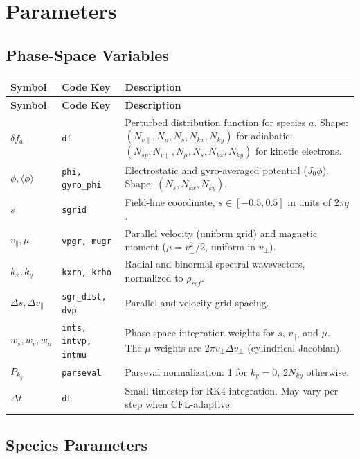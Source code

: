 \documentclass{article}
\theoremstyle{plain}
\theoremstyle{definition}
\theoremstyle{remark}
\begin{document}
\newpage
\appendix
\onecolumn

\section{Parameters}

\subsection{Phase-Space Variables}
\renewcommand{\arraystretch}{1.4}
\begin{longtable}{p{} p{} p{}}
\toprule
\textbf{Symbol} & \textbf{Code Key} & \textbf{Description} \\
\midrule
\endfirsthead
\toprule
\textbf{Symbol} & \textbf{Code Key} & \textbf{Description} \\
\midrule
\endhead
\bottomrule
\endfoot
$\delta f_a$ & \texttt{df} & Perturbed distribution function for species $a$. Shape: $(N_{v\parallel}, N_\mu, N_s, N_{kx}, N_{ky})$ for adiabatic; $(N_{sp}, N_{v\parallel}, N_\mu, N_s, N_{kx}, N_{ky})$ for kinetic electrons. \\
$\phi, \langle\phi\rangle$ & \texttt{phi, gyro\_phi} & Electrostatic and gyro-averaged potential ($J_0 \phi$). Shape: $(N_s, N_{kx}, N_{ky})$. \\
$s$ & \texttt{sgrid} & Field-line coordinate, $s \in [-0.5, 0.5]$ in units of $2\pi q$. \\
$v_\parallel, \mu$ & \texttt{vpgr, mugr} & Parallel velocity (uniform grid) and magnetic moment ($\mu = v_\perp^2/2$, uniform in $v_\perp$). \\
$k_x, k_y$ & \texttt{kxrh, krho} & Radial and binormal spectral wavevectors, normalized to $\rho_{ref}$. \\
$\Delta s, \Delta v_\parallel$ & \texttt{sgr\_dist, dvp} & Parallel and velocity grid spacing. \\
$w_s, w_v, w_\mu$ & \texttt{ints, intvp, intmu} & Phase-space integration weights for $s$, $v_\parallel$, and $\mu$. The $\mu$ weights are $2\pi v_\perp \Delta v_\perp$ (cylindrical Jacobian). \\
$P_{k_y}$ & \texttt{parseval} & Parseval normalization: 1 for $k_y=0$, $2N_{ky}$ otherwise. \\
$\Delta t$ & \texttt{dt} & Small timestep for RK4 integration. May vary per step when CFL-adaptive. \\
\bottomrule
\end{longtable}

\subsection{Species Parameters}
\end{document}
